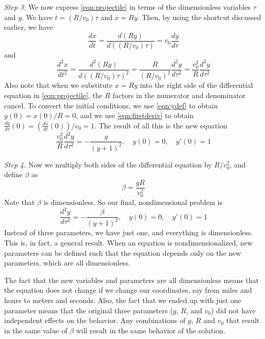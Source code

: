 \documentclass[reqno]{immbook}
\numberwithin{equation}{chapter}
\numberwithin{question}{section}
\numberwithin{theorem}{chapter}
\numberwithin{figure}{chapter}
\theoremstyle{definition}
\begin{document}
\vspace{0.1cm}
\noindent
\emph{Step 3.}
We now express \eqref{eqn:projectile} in terms of the dimensionless variables
$\tau$ and $y$.  We have $t = (R/v_0)\tau$ and $x = Ry$.
Then, by using the shortcut discussed earlier, we have
\begin{equation}
   \frac{dx}{dt} = \frac{d(Ry)}{d\left((R/v_0)\tau\right)}
      = v_0\frac{dy}{d\tau}
   \label{eqn:firstderiv}
\end{equation}
and
\begin{equation}
   \frac{d^2x}{dt^2} = \frac{d^2 (Ry)}{d\left((R/v_0)\tau\right)^2}
      = \frac{R}{(R/v_0)^2}\frac{d^2y}{d\tau^2}
      = \frac{v_0^2}{R}\frac{d^2y}{d\tau^2}
\end{equation}
Also note that when we substitute $x = Ry$ into the right side of the
differential equation in \eqref{eqn:projectile}, the $R$ factors in the
numerator and denominator cancel.
To convert the initial conditions, we use \eqref{eqn:ydef}
to obtain $y(0) = x(0)/R = 0$, and we use \eqref{eqn:firstderiv}
to obtain $\frac{dy}{d\tau}(0) = \left(\frac{dx}{dt}(0)\right)/v_0 = 1$.
The result of all this is the new equation
\begin{equation}
   \frac{v_0^2}{R} \frac{d^2y}{d\tau^2} = -\frac{g}{(y+1)^2},
      \quad y(0)=0, \quad y'(0)=1
\end{equation}

\vspace{0.1cm}
\noindent
\emph{Step 4.}
Now we multiply both sides of the differential equation by
$R/v_0^2$, and define $\beta$ as
\begin{equation}
   \beta = \frac{gR}{v_0^2}
\end{equation}
Note that $\beta$ is dimensionless.
So our final, nondimensional problem is
\begin{equation}
   \frac{d^2y}{d\tau^2} = -\frac{\beta}{(y+1)^2},
      \quad y(0)=0, \quad y'(0)=1
\end{equation}
Instead of three parameters, we have just one, and everything
is dimensionless.
This is, in fact, a general result.  When an equation
is nondimensionalized, new parameters can be defined such
that the equation depends only on the new parameters, which are
all dimensionless.
 
The fact that the new variables
and parameters are all dimensionless means that the equation does not change
if we change our coordinates, say from miles and hours to meters and seconds.
Also, the fact that we ended up with just one parameter means that
the original three parameters ($g$, $R$, and $v_0$) did not have
independent effects on the behavior.  Any combinations of
$g$, $R$ and $v_0$ that result in the same value of $\beta$
will result in the same behavior of the solution.
\end{document}

